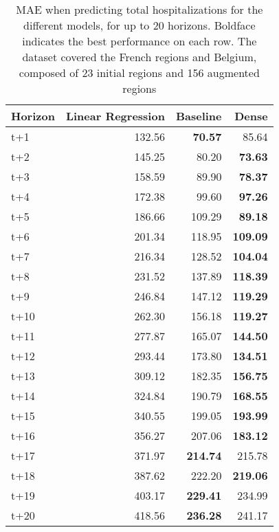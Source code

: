 \begin{table}[H]
\centering
\caption{MAE when predicting total hospitalizations for the different models, for up to 20 horizons. Boldface indicates the best performance on each row. The dataset covered the French regions and Belgium, composed of 23 initial regions and 156 augmented regions }
\label{tab:MAE_comparison}
\begin{tabular}{lrrr}
\toprule
Horizon &  Linear Regression &  Baseline &  Dense \\
\midrule
t+1  & 132.56  & \textbf{70.57}  & 85.64  \\
t+2  & 145.25  & 80.20  & \textbf{73.63}  \\
t+3  & 158.59  & 89.90  & \textbf{78.37}  \\
t+4  & 172.38  & 99.60  & \textbf{97.26}  \\
t+5  & 186.66  & 109.29  & \textbf{89.18}  \\
t+6  & 201.34  & 118.95  & \textbf{109.09}  \\
t+7  & 216.34  & 128.52  & \textbf{104.04}  \\
t+8  & 231.52  & 137.89  & \textbf{118.39}  \\
t+9  & 246.84  & 147.12  & \textbf{119.29}  \\
t+10  & 262.30  & 156.18  & \textbf{119.27}  \\
t+11  & 277.87  & 165.07  & \textbf{144.50}  \\
t+12  & 293.44  & 173.80  & \textbf{134.51}  \\
t+13  & 309.12  & 182.35  & \textbf{156.75}  \\
t+14  & 324.84  & 190.79  & \textbf{168.55}  \\
t+15  & 340.55  & 199.05  & \textbf{193.99}  \\
t+16  & 356.27  & 207.06  & \textbf{183.12}  \\
t+17  & 371.97  & \textbf{214.74}  & 215.78  \\
t+18  & 387.62  & 222.20  & \textbf{219.06}  \\
t+19  & 403.17  & \textbf{229.41}  & 234.99  \\
t+20  & 418.56  & \textbf{236.28}  & 241.17  \\

\bottomrule
\end{tabular}
\end{table}
